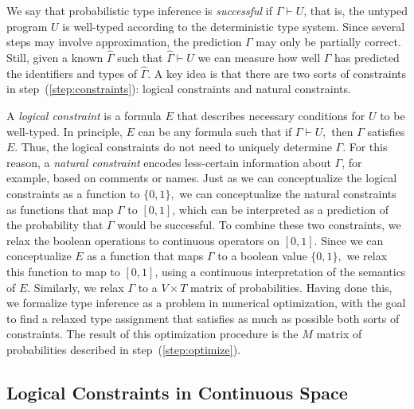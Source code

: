\documentclass[sigplan,10pt,review,anonymous]{acmart} %
\theoremstyle{plain}
\theoremstyle{remark}
\theoremstyle{definition}
\begin{document}
We say that probabilistic type inference is \emph{successful} if $\Gamma \vdash U$, that is, the untyped program $U$ is well-typed according to the deterministic type system.
%
Since several steps may involve approximation, the prediction $\Gamma$ may only be partially correct.
%
Still, given a known $\hat{\Gamma}$ such that $\hat{\Gamma} \vdash U$ we can measure how well $\Gamma$ has predicted the identifiers and types of $\hat{\Gamma}$.
%
A key idea is that there are two sorts of constraints in step~(\ref{step:constraints}): logical constraints and natural
constraints.

A \emph{logical constraint} is a formula $E$ that describes
necessary conditions for $U$ to be well-typed.
In principle, $E$ can be any formula such that if $\Gamma \vdash U,$
then $\Gamma$ satisfies $E$.
Thus, the logical constraints
do not need to uniquely determine $\Gamma$.
For this reason, a \emph{natural constraint}
encodes less-certain information about $\Gamma$,
for example, based on comments or names.
Just as we can conceptualize the logical
constraints as a function to $\{0, 1\},$
we can conceptualize the natural constraints as functions
that map $\Gamma$ to $[0, 1]$, which can be interpreted
as a prediction of the probability that $\Gamma$ would
be successful. To combine these two constraints, we relax the boolean operations to continuous operators on $[0, 1]$.
Since we can conceptualize $E$ as a function
that maps $\Gamma$ to a boolean value $\{0, 1\},$
we relax this function to map to $[0,1]$, using
a continuous interpretation of the semantics of $E$.
Similarly, we relax $\Gamma$ to a $V \times T$ matrix of probabilities.
Having done this,
we formalize type inference as a problem in
numerical optimization, with the goal to find a relaxed type assignment
that satisfies as much as possible both sorts of constraints.
The result of this optimization procedure is the
$M$ matrix of probabilities described in step~(\ref{step:optimize}).

\subsection{Logical Constraints in Continuous Space}\label{ssec:logcon}
\end{document}
